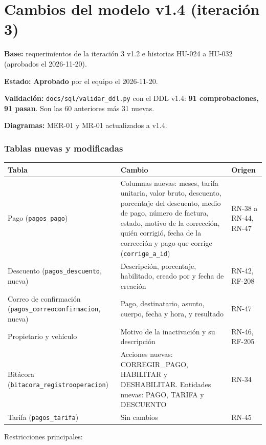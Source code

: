 \section{Cambios del modelo v1.4 (iteración 3)}
\textbf{Base:} requerimientos de la iteración 3 v1.2 e historias HU-024 a HU-032 (aprobados el 2026-11-20).

\textbf{Estado:} \textbf{Aprobado} por el equipo el 2026-11-20.

\textbf{Validación:} \texttt{docs/sql/validar\_ddl.py} con el DDL v1.4: \textbf{91 comprobaciones, 91 pasan}. Son las 60 anteriores más 31 nuevas.

\textbf{Diagramas:} MER-01 y MR-01 actualizados a v1.4.


\subsubsection{Tablas nuevas y modificadas}

\begin{longtable}{>{\raggedright\arraybackslash}p{5.6000000000000005cm}>{\raggedright\arraybackslash}p{7.3cm}>{\raggedright\arraybackslash}p{1.5cm}}
\toprule
\textbf{Tabla} & \textbf{Cambio} & \textbf{Origen}\\
\midrule\endhead
Pago (\texttt{pagos\_pago}) & Columnas nuevas: meses, tarifa unitaria, valor bruto, descuento, porcentaje del descuento, medio de pago, número de factura, estado, motivo de la corrección, quién corrigió, fecha de la corrección y pago que corrige (\texttt{corrige\_a\_id}) & RN-38 a RN-44, RN-47\\
Descuento (\texttt{pagos\_descuento}, nueva) & Descripción, porcentaje, habilitado, creado por y fecha de creación & RN-42, RF-208\\
Correo de confirmación (\texttt{pagos\_correoconfirmacion}, nueva) & Pago, destinatario, asunto, cuerpo, fecha y hora, y resultado & RN-47\\
Propietario y vehículo & Motivo de la inactivación y su descripción & RN-46, RF-205\\
Bitácora (\texttt{bitacora\_registrooperacion}) & Acciones nuevas: CORREGIR\_PAGO, HABILITAR y DESHABILITAR. Entidades nuevas: PAGO, TARIFA y DESCUENTO & RN-34\\
Tarifa (\texttt{pagos\_tarifa}) & Sin cambios & RN-45\\
\bottomrule
\end{longtable}


Restricciones principales:


